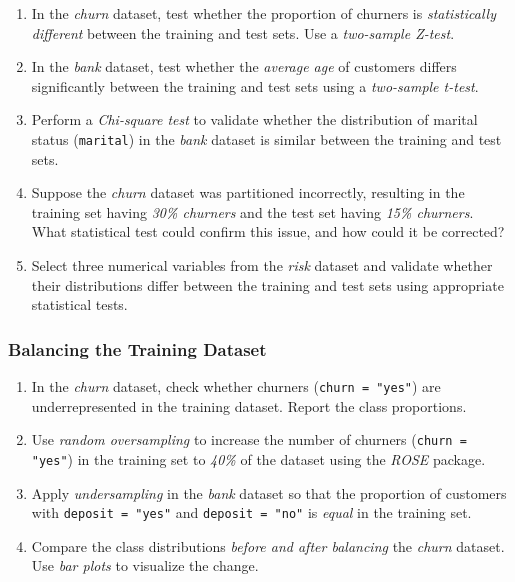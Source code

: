 \documentclass[
]{book}
\newcommand{\passthrough}[1]{#1}
\theoremstyle{definition}
\theoremstyle{definition}
\theoremstyle{definition}
\theoremstyle{definition}
\theoremstyle{remark}
\begin{document}
\begin{enumerate}
\def\labelenumi{\arabic{enumi}.}
\setcounter{enumi}{19}
\item
  In the \emph{churn} dataset, test whether the proportion of churners is \emph{statistically different} between the training and test sets. Use a \emph{two-sample Z-test}.
\item
  In the \emph{bank} dataset, test whether the \emph{average age} of customers differs significantly between the training and test sets using a \emph{two-sample t-test}.
\item
  Perform a \emph{Chi-square test} to validate whether the distribution of marital status (\passthrough{\lstinline!marital!}) in the \emph{bank} dataset is similar between the training and test sets.
\item
  Suppose the \emph{churn} dataset was partitioned incorrectly, resulting in the training set having \emph{30\% churners} and the test set having \emph{15\% churners}. What statistical test could confirm this issue, and how could it be corrected?
\item
  Select three numerical variables from the \emph{risk} dataset and validate whether their distributions differ between the training and test sets using appropriate statistical tests.
\end{enumerate}

\subsubsection*{Balancing the Training Dataset}\label{balancing-the-training-dataset-1}

\begin{enumerate}
\def\labelenumi{\arabic{enumi}.}
\setcounter{enumi}{24}
\item
  In the \emph{churn} dataset, check whether churners (\passthrough{\lstinline!churn = "yes"!}) are underrepresented in the training dataset. Report the class proportions.
\item
  Use \emph{random oversampling} to increase the number of churners (\passthrough{\lstinline!churn = "yes"!}) in the training set to \emph{40\%} of the dataset using the \emph{ROSE} package.
\item
  Apply \emph{undersampling} in the \emph{bank} dataset so that the proportion of customers with \passthrough{\lstinline!deposit = "yes"!} and \passthrough{\lstinline!deposit = "no"!} is \emph{equal} in the training set.
\item
  Compare the class distributions \emph{before and after balancing} the \emph{churn} dataset. Use \emph{bar plots} to visualize the change.
\end{enumerate}
\end{document}
